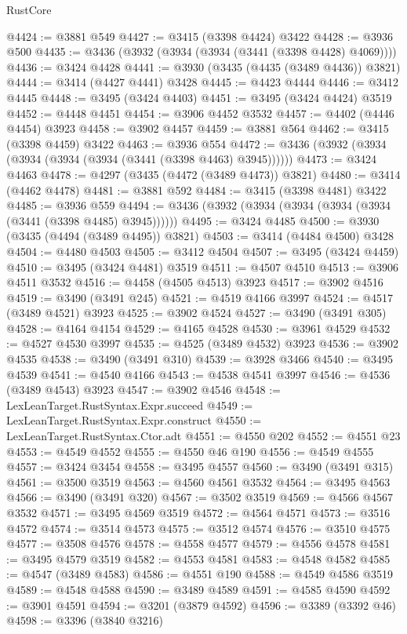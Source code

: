 \begin{lexlean}{RustCore}
\begin{coremodule}
@4424 := @3881 @549
@4427 := @3415 (@3398 @4424) @3422
@4428 := @3936 @500
@4435 := @3436 (@3932 (@3934 (@3934 (@3441 (@3398 @4428) @4069))))
@4436 := @3424 @4428
@4441 := @3930 (@3435 (@4435 (@3489 @4436)) @3821)
@4444 := @3414 (@4427 @4441) @3428
@4445 := @4423 @4444
@4446 := @3412 @4445
@4448 := @3495 (@3424 @4403)
@4451 := @3495 (@3424 @4424) @3519
@4452 := @4448 @4451
@4454 := @3906 @4452 @3532
@4457 := @4402 (@4446 @4454) @3923
@4458 := @3902 @4457
@4459 := @3881 @564
@4462 := @3415 (@3398 @4459) @3422
@4463 := @3936 @554
@4472 := @3436 (@3932 (@3934 (@3934 (@3934 (@3934 (@3441 (@3398 @4463) @3945))))))
@4473 := @3424 @4463
@4478 := @4297 (@3435 (@4472 (@3489 @4473)) @3821)
@4480 := @3414 (@4462 @4478)
@4481 := @3881 @592
@4484 := @3415 (@3398 @4481) @3422
@4485 := @3936 @559
@4494 := @3436 (@3932 (@3934 (@3934 (@3934 (@3934 (@3441 (@3398 @4485) @3945))))))
@4495 := @3424 @4485
@4500 := @3930 (@3435 (@4494 (@3489 @4495)) @3821)
@4503 := @3414 (@4484 @4500) @3428
@4504 := @4480 @4503
@4505 := @3412 @4504
@4507 := @3495 (@3424 @4459)
@4510 := @3495 (@3424 @4481) @3519
@4511 := @4507 @4510
@4513 := @3906 @4511 @3532
@4516 := @4458 (@4505 @4513) @3923
@4517 := @3902 @4516
@4519 := @3490 (@3491 @245)
@4521 := @4519 @4166 @3997
@4524 := @4517 (@3489 @4521) @3923
@4525 := @3902 @4524
@4527 := @3490 (@3491 @305)
@4528 := @4164 @4154
@4529 := @4165 @4528
@4530 := @3961 @4529
@4532 := @4527 @4530 @3997
@4535 := @4525 (@3489 @4532) @3923
@4536 := @3902 @4535
@4538 := @3490 (@3491 @310)
@4539 := @3928 @3466
@4540 := @3495 @4539
@4541 := @4540 @4166
@4543 := @4538 @4541 @3997
@4546 := @4536 (@3489 @4543) @3923
@4547 := @3902 @4546
@4548 := LexLeanTarget.RustSyntax.Expr.succeed
@4549 := LexLeanTarget.RustSyntax.Expr.construct
@4550 := LexLeanTarget.RustSyntax.Ctor.adt
@4551 := @4550 @202
@4552 := @4551 @23
@4553 := @4549 @4552
@4555 := @4550 @46 @190
@4556 := @4549 @4555
@4557 := @3424 @3454
@4558 := @3495 @4557
@4560 := @3490 (@3491 @315)
@4561 := @3500 @3519
@4563 := @4560 @4561 @3532
@4564 := @3495 @4563
@4566 := @3490 (@3491 @320)
@4567 := @3502 @3519
@4569 := @4566 @4567 @3532
@4571 := @3495 @4569 @3519
@4572 := @4564 @4571
@4573 := @3516 @4572
@4574 := @3514 @4573
@4575 := @3512 @4574
@4576 := @3510 @4575
@4577 := @3508 @4576
@4578 := @4558 @4577
@4579 := @4556 @4578
@4581 := @3495 @4579 @3519
@4582 := @4553 @4581
@4583 := @4548 @4582
@4585 := @4547 (@3489 @4583)
@4586 := @4551 @190
@4588 := @4549 @4586 @3519
@4589 := @4548 @4588
@4590 := @3489 @4589
@4591 := @4585 @4590
@4592 := @3901 @4591
@4594 := @3201 (@3879 @4592)
@4596 := @3389 (@3392 @46)
@4598 := @3396 (@3840 @3216)

\end{coremodule}
\end{lexlean}

